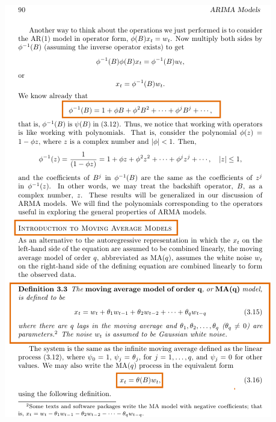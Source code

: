 \documentclass{article}
\begin{document}
\newpage\includegraphics[width=.9\textwidth]{shumway7}
\end{document}
